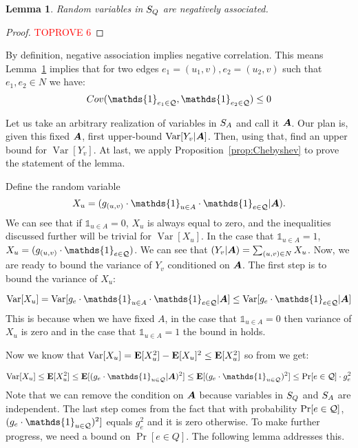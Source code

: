 \documentclass[letterpaper,11pt]{article}
\DeclareMathOperator{\E}{\ensuremath{\normalfont \textbf{E}}}
\DeclareMathOperator{\var}{Var}
\newtheorem{lemma}{Lemma}[section]
\begin{document}
\begin{lemma}\label{lem:NA_Q}
Random variables in $S_Q$ are negatively associated. 
\end{lemma}
\begin{proof}\textcolor{red}{TOPROVE 6}\end{proof}

By definition, negative association implies negative correlation. This means Lemma~\ref{lem:NA_Q} implies that for two edges $e_1 = (u_1, v), e_2 = (u_2, v)$ such that $e_1, e_2 \in N$ we have: 
\begin{equation}\label{eq:negyjhwekj}
    \Cov(\mathds{1}_{e_1 \in \qstar}, \mathds{1}_{e_2 \in \qstar}) \leq 0
\end{equation}

Let us take an arbitrary realization of variables in $S_A$ and call it $\bm{A}$. Our plan is, given this fixed $\bm{A}$, first upper-bound $\var[Y_v | \Aset]$. Then, using that, find an upper bound for $\var[Y_v]$. At last, we apply Proposition~\ref{prop:Chebyshev} to prove the statement of the lemma.


Define the random variable $$X_u = (g_{(u, v)} \cdot \mathds{1}_{u \in A} \cdot \mathds{1}_{e \in \qstar} | \Aset).$$ We can see that if $\mathds{1}_{u \in A} = 0$, $X_u$ is always equal to zero, and the inequalities discussed further will be trivial for $\var[X_u]$. In the case that $\mathds{1}_{u \in A} = 1$, $X_u = (g_{(u, v)} \cdot \mathds{1}_{e \in \qstar})$. We can see that $(Y_v | \bm{A}) = \sum_{(u, v) \in N} X_u$. Now, we are ready to bound the variance of $Y_v$ conditioned on $\bm{A}$. The first step is to bound the variance of $X_u$: 

\begin{equation}\label{eq:var_1}
\var[X_u] = \var[ g_{e} \cdot \mathds{1}_{u\in A} \cdot \mathds{1}_{e\in \qstar} | \Aset] \leq \var[ g_{e} \cdot \mathds{1}_{e\in \qstar} | \Aset]
\end{equation}
This is because when we have fixed $A$, in the case that $\mathds{1}_{u\in A} = 0$ then variance of $X_u$ is zero and in the case that $\mathds{1}_{u\in A} = 1$ the bound in  holds. 

Now we know that $\var[X_u] = \E[X_u^2] - \E[X_u]^2 \leq \E[X_u^2]$ so from  we get: 

\begin{equation}\label{eq:var_2}
\var[X_u] \leq \E[X_u^2] \leq \E[(g_e \cdot \mathds{1}_{u\in \qstar} | \Aset)^2] \leq \E[(g_e \cdot \mathds{1}_{u\in \qstar})^2] \leq 
\Pr[e \in \qstar] \cdot g_e^2
\end{equation}
Note that we can remove the condition on $\bm{A}$ because variables in $S_Q$ and $S_A$ are independent. The last step comes from the fact that with probability $\Pr[e \in \mathcal{Q}]$, $(g_e \cdot \mathds{1}_{u\in \qstar})^2]$ equals $g_e^2$ and it is zero otherwise. To make further progress, we need a bound on $\Pr[e\in Q]$. The following lemma addresses this.
\end{document}
